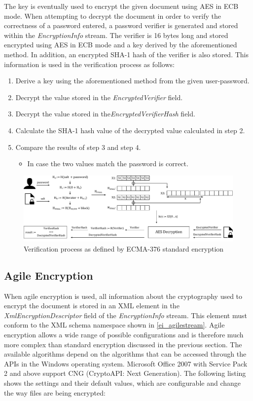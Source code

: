 \documentclass[11pt,oneside]{fithesis2}
\begin{document}
The key is eventually used to encrypt the given document using AES in ECB mode. When attempting to decrypt the document in order to verify the correctness of a password entered, a password verifier is generated and stored within the \textit{EncryptionInfo} stream. The verifier is 16 bytes long and stored encrypted using AES in ECB mode and a key derived by the aforementioned method. In addition, an encrypted SHA-1 hash of the verifier is also stored. This information is used in the verification process as follows:

\begin{enumerate}
\setlength\itemsep{0.1em}
\item{Derive a key using the aforementioned method from the given user-password.}
\item{Decrypt the value stored in the \textit{EncryptedVerifier} field.}
\item{Decrypt the value stored in the\textit{EncryptedVerifierHash} field.}
\item{Calculate the SHA-1 hash value of the decrypted value calculated in step 2.}
\item{Compare the results of step 3 and step 4. 
	\begin{itemize}
		\item{In case the two values match the password is correct.}
	\end{itemize}}
\end{enumerate}

\begin{figure}[ht]
	\centering
	\includegraphics[width=1\textwidth]{figures/standard_encryption_scheme.pdf}
	\caption{Verification process as defined by ECMA-376 standard encryption}
	\label{standard_encryption_scheme}
\end{figure}

\subsection{Agile Encryption}

When agile encryption is used, all information about the cryptography used to encrypt the document is stored in an XML element in the \textit{XmlEncryptionDescriptor} field of the \textit{EncryptionInfo} stream. This element must conform to the XML schema namespace shown in \ref{ei_agilestream}. Agile encryption allows a wide range of possible configurations and is therefore much more complex than standard encryption discussed in the previous section. The available algorithms depend on the algorithms that can be accessed through the APIs in the Windows operating system. Microsoft Office 2007 with Service Pack 2 and above support CNG (CryptoAPI: Next Generation). The following listing shows the settings and their default values, which are configurable and change the way files are being encrypted:
\end{document}
